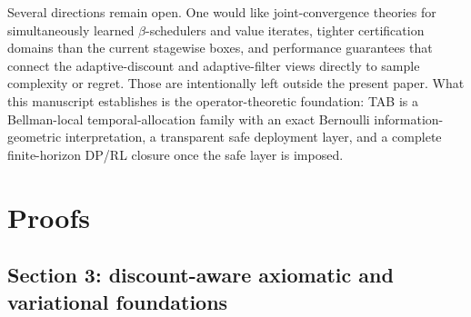 \documentclass{article}
\theoremstyle{remark}
\begin{document}
Several directions remain open. One would like joint-convergence theories for simultaneously learned $\beta$-schedulers and value iterates, tighter certification domains than the current stagewise boxes, and performance guarantees that connect the adaptive-discount and adaptive-filter views directly to sample complexity or regret. Those are intentionally left outside the present paper. What this manuscript establishes is the operator-theoretic foundation: TAB is a Bellman-local temporal-allocation family with an exact Bernoulli information-geometric interpretation, a transparent safe deployment layer, and a complete finite-horizon DP/RL closure once the safe layer is imposed.

\appendix
\section{Proofs}
\label{app:proofs}

\subsection{Section 3: discount-aware axiomatic and variational foundations}
\label{app:axioms}
\end{document}
